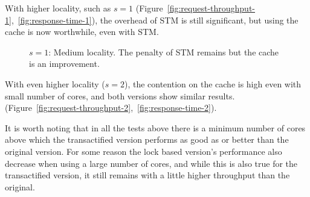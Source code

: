 \documentclass[preprint,11pt]{sigplanconf}
\begin{document}
With higher locality, such as $s=1$
(Figure~\ref{fig:request-throughput-1},~\ref{fig:response-time-1}), the overhead
of STM is still significant, but using the cache is now worthwhile, even with
STM. 

\begin{figure}
 \centering
 \hfill
 \caption{$s = 1$: Medium locality. The penalty of STM remains but the cache is an improvement.}
\end{figure}

With even higher locality ($s=2$), the contention on the cache is high even with
small number of cores, and both versions show similar results.
(Figure~\ref{fig:request-throughput-2},~\ref{fig:response-time-2}).

It is worth noting that in all the tests above there is a minimum number of
cores above which the transactified version performs as good as or better than
the original version. For some reason the lock based version's performance also
decrease when using a large number of cores, and while this is also true for the
transactified version, it still remains with a little higher throughput than the
original.
\end{document}
